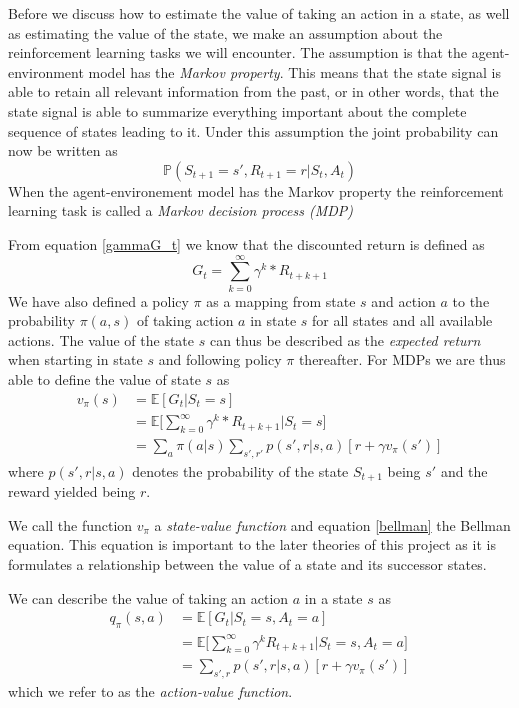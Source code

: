 \documentclass[11pt]{article}
\begin{document}
Before we discuss how to estimate the value of taking an action in a state, as
well as estimating the value of the state, we make an assumption about the reinforcement
learning tasks we will encounter.
The assumption is that the agent-environment model has the \textit{Markov property}.
This means that the state signal is able to retain all relevant information
from the past, or in other words, that the state signal is able to summarize
everything important about the complete sequence of states leading to it.
Under this assumption the joint probability can now be written as
\begin{equation}
    \mathds{P}(S_{t+1} = s', R_{t+1} = r | S_t, A_t)
\end{equation}
When the agent-environement model has the Markov property the reinforcement
learning task is called a \textit{Markov decision process (MDP)}

From equation \ref{gammaG_t} we know that the discounted return
is defined as 
\begin{equation}
    G_t = \sum\limits_{k=0}^\infty \gamma^k * R_{t+k+1}
\end{equation}
We have also defined a policy $\pi$ as a mapping from state $s$ and action $a$
to the probability $\pi(a, s)$ of taking action $a$ in state $s$ for all states
and all available actions.
The value of the state $s$ can thus be described as the \textit{expected return}
when starting in state $s$ and following policy $\pi$ thereafter\cite{RLbook}.
For MDPs we are thus able to define the value of state $s$ as
\begin{align}\label{eq:sv}
        v_\pi(s)  & = \mathds{E}[G_t | S_t = s]\\
                  & = \mathds{E}\bigg[\sum\limits_{k=0}^\infty \gamma^k * R_{t+k+1} \bigg| S_t = s\bigg]\\
                  & = \sum\limits_{a} \pi(a | s) \sum\limits_{s', r'} p(s', r | s,a)[r + \gamma v_\pi(s')]\label{bellman}
\end{align}
where $p(s', r | s, a)$ denotes the probability of the state $S_{t+1}$
being $s'$ and the reward yielded being $r$.

We call the function $v_\pi$ a \textit{state-value function} and equation
\ref{bellman} the Bellman equation.
This equation is important to the later theories of this project as
it is formulates a relationship between the value of a state and its
successor states.

We can describe the value of taking an action $a$ in a state $s$ as
\begin{align}\label{eq:av}
    q_{\pi}(s, a) & = \mathds{E}[G_{t} | S_{t} = s, A_{t} = a]\\
                  & = \mathds{E}\bigg[\sum_{k = 0}^{\infty} \gamma^{k} R_{t + k + 1} \bigg| S_{t} = s, A_{t} = a \bigg]\\
                  & = \sum\limits_{s', r} p(s', r | s, a)[r + \gamma
                  v_\pi(s')]
\end{align}
which we refer to as the \textit{action-value function}.



%
%
\end{document}
